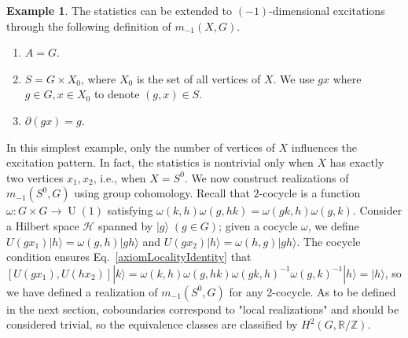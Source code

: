 \documentclass[reprint, amsmath, amssymb, showpacs, floatfix, longbibliography, aps, twocolumn, superscriptaddress, nofootinbib]{revtex4-2}
\newcommand{\ZZ}{{\mathbb Z}}
\newcommand{\RR}{{\mathbb R}}
\theoremstyle{definition}
\newtheorem{example}{Example}[section]
\begin{document}
\begin{example}\label{expH2(G)}
The statistics can be extended to $(-1)$-dimensional excitations through the following definition of $m_{-1}(X,G)$.
	\begin{enumerate}
		\item \(A=G\).
		\item \(S = G\times X_0\), where \(X_0\) is the set of all vertices of $X$. We use $gx$ where $ g\in G,x\in X_0$ to denote $(g,x)\in S$.
		\item $\partial(gx)=g$. 
	\end{enumerate}
	
	In this simplest example, only the number of vertices of $X$ influences the excitation pattern. In fact, the statistics is nontrivial only when $X$ has exactly two vertices $x_1,x_2$, i.e., when $X=S^0$. We now construct realizations of $m_{-1}(S^0,G)$ using group cohomology. Recall that $2$-cocycle is a function $\omega:G\times G\rightarrow \operatorname{U}(1)$ satisfying $\omega(k,h)\omega(g,hk)=\omega(gk,h)\omega(g,k)$. Consider a Hilbert space $\mathcal{H}$ spanned by $|g\rangle\;(g\in G)$; given a cocycle $\omega$, we define $ U(gx_1)|h\rangle=\omega(g,h)|gh\rangle$ and $ U(gx_2)|h\rangle=\omega(h,g)|gh\rangle$. The cocycle condition ensures Eq.~\eqref{axiomLocalityIdentity} that $[ U(gx_1), U(hx_2)]|k\rangle=\omega(k,h)\omega(g,hk)\omega(gk,h)^{-1}\omega(g,k)^{-1}|h\rangle=|h\rangle$, so we have defined a realization of $m_{-1}(S^0,G)$ for any 2-cocycle. As to be defined in the next section, coboundaries correspond to "local realizations" and should be considered trivial, so the equivalence classes are classified by $H^2(G,\RR/\ZZ)$. 
	
\end{example}
\end{document}
